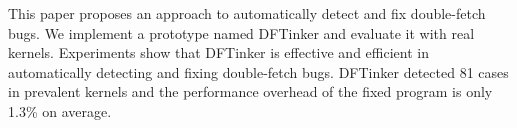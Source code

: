 \documentclass[10pt]{llncs}
\begin{document}
This paper proposes an approach to automatically detect and fix double-fetch bugs. We implement a prototype named DFTinker and evaluate it with real kernels. Experiments show that DFTinker is effective and efficient in automatically detecting and fixing double-fetch bugs. DFTinker detected 81 cases in prevalent kernels and the performance overhead of the fixed program is only 1.3\% on average.








\end{document}
